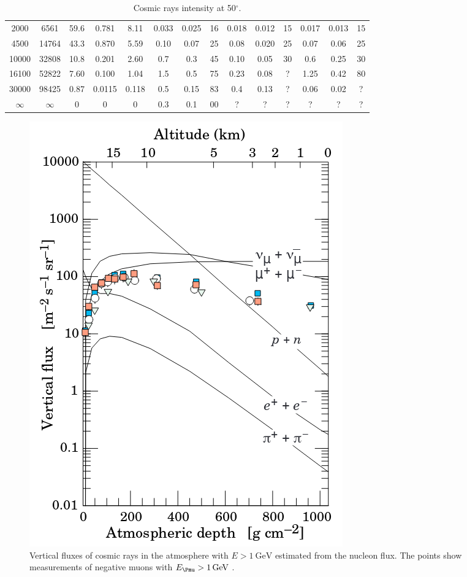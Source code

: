 \begin{table}
\begin{tabular}{|c|c|c|c|c|c|c|c|c|c|c|c|c|c|}
2000 & 6561 & 59.6 & 0.781 & 8.11 & 0.033 & 0.025 & 16 & 0.018 & 0.012 & 15 & 0.017 & 0.013 & 15 \\
4500 & 14764 & 43.3 & 0.870 & 5.59 & 0.10 & 0.07 & 25 & 0.08 & 0.020 & 25 & 0.07 & 0.06 & 25 \\
10000 & 32808 & 10.8 & 0.201 & 2.60 & 0.7 & 0.3 & 45 & 0.10 & 0.05 & 30 & 0.6 & 0.25 & 30 \\
16100 & 52822 & 7.60 & 0.100 & 1.04 & 1.5 & 0.5 & 75 & 0.23 & 0.08 & ? & 1.25 & 0.42 & 80 \\
30000 & 98425 & 0.87 & 0.0115 & 0.118 & 0.5 & 0.15 & 83 & 0.4 & 0.13 & ? & 0.06 & 0.02 & ? \\
$\infty$ & $\infty$ & 0 & 0 & 0 & 0.3 & 0.1 & 00 & ? & ? & ? & ? & ? & ? \\ \hline
\end{tabular}
\caption{Cosmic rays intensity at 50$^\circ$.}
\label{tab:flx}
\end{table}

\begin{figure}[htbp]
\centering
\includegraphics[width=0.5\linewidth]{./fig/cosflux.png}
\caption{Vertical fluxes of cosmic rays in the atmosphere with $E>\SI{1}{\GeV}$ estimated from the nucleon flux. The points show measurements of negative muons with $E_{\Pmu} > \SI{1}{\GeV}$ \cite{Tanabashi:2018oca}.}
\label{fig:cosflux}
\end{figure}



